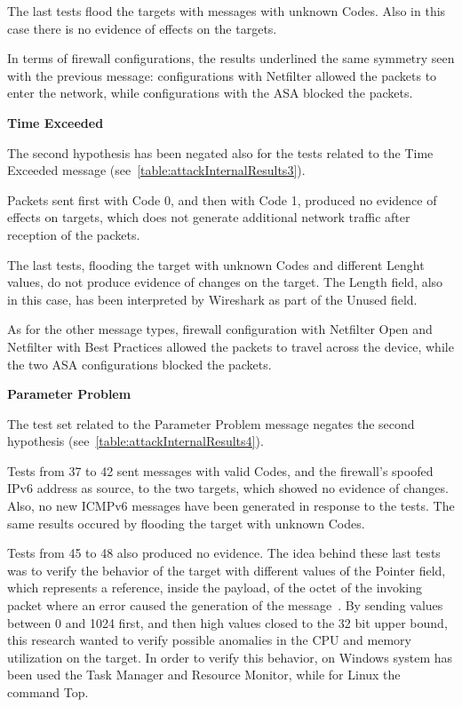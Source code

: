 \documentclass[12pt]{article}
\begin{document}
The last tests flood the targets with messages with unknown Codes. Also in this case there is no evidence of effects on the targets.

In terms of firewall configurations, the results underlined the same symmetry seen with the previous message: configurations with Netfilter allowed the packets to enter the network, while configurations with the ASA blocked the packets.

\textbf{Time Exceeded}

The second hypothesis has been negated also for the tests related to the Time Exceeded message (see~\cref{table:attackInternalResults3}).

Packets sent first with Code 0, and then with Code 1, produced no evidence of effects on targets, which does not generate additional network traffic after reception of the packets. 

The last tests, flooding the target with unknown Codes and different Lenght values, do not produce evidence of changes on the target. The Length field, also in this case, has been interpreted by Wireshark as part of the Unused field.

As for the other message types, firewall configuration with Netfilter Open and Netfilter with Best Practices allowed the packets to travel across the device, while the two ASA configurations blocked the packets.

\textbf{Parameter Problem}

The test set related to the Parameter Problem message negates the second hypothesis (see~\cref{table:attackInternalResults4}).

Tests from 37 to 42 sent messages with valid Codes, and the firewall's spoofed IPv6 address as source, to the two targets, which showed no evidence of changes. Also, no new ICMPv6 messages have been generated in response to the tests. The same results occured by flooding the target with unknown Codes.

Tests from 45 to 48 also produced no evidence. The idea behind these last tests was to verify the behavior of the target with different values of the Pointer field, which represents a reference, inside the payload, of the octet of the invoking packet where an error caused the generation of the message~\cite{rfc4443}. By sending values between 0 and 1024 first, and then high values closed to the 32 bit upper bound, this research wanted to verify possible anomalies in the CPU and memory utilization on the target. In order to verify this behavior, on Windows system has been used the Task Manager and Resource Monitor, while for Linux the command Top.
\end{document}
